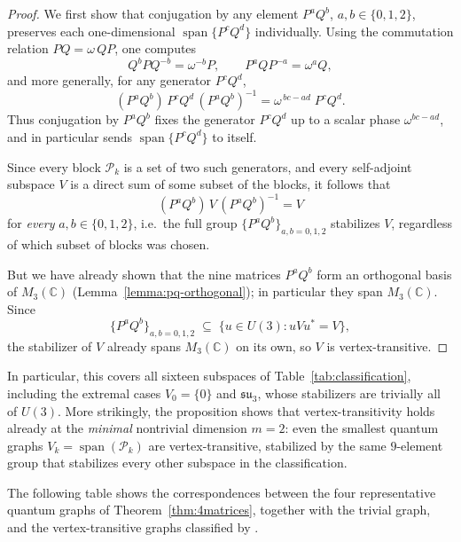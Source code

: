 \begin{proof}
    We first show that conjugation by any element \( P^aQ^b \),
    \( a,b \in \{0,1,2\} \), preserves each one-dimensional
    \( \operatorname{span}\{P^cQ^d\} \) individually. Using the
    commutation relation \( PQ = \omega\,QP \), one computes
    \[
        Q^bPQ^{-b} = \omega^{-b}P, \qquad P^aQP^{-a} = \omega^{a}Q,
    \]
    and more generally, for any generator \( P^cQ^d \),
    \[
        (P^aQ^b)\,P^cQ^d\,(P^aQ^b)^{-1}
        = \omega^{\,bc-ad}\; P^cQ^d.
    \]
    Thus conjugation by \( P^aQ^b \) fixes the generator \( P^cQ^d \)
    up to a scalar phase \( \omega^{bc-ad} \), and in particular sends
    \( \operatorname{span}\{P^cQ^d\} \) to itself.

    Since every block \( \mathcal{P}_k \) is a set of two such
    generators, and every self-adjoint subspace \( V \) is a direct
    sum of some subset of the blocks, it follows that
    \[
        (P^aQ^b)\, V\, (P^aQ^b)^{-1} = V
    \]
    for \emph{every} \( a,b \in \{0,1,2\} \), i.e.\ the full
    group \( \{P^aQ^b\}_{a,b=0,1,2} \) stabilizes
    \( V \), regardless of which subset of blocks was chosen.

    But we have already shown that the nine matrices \( P^aQ^b \) form
    an orthogonal basis of \( M_{3}(\mathbb{C}) \)
    (Lemma~\ref{lemma:pq-orthogonal});
    in particular they
    span \( M_{3}(\mathbb{C}) \). Since
    \[
        \{P^aQ^b\}_{a,b=0,1,2} \;\subseteq\; \{ u \in U(3) : uVu^* = V \},
    \]
    the stabilizer of \( V \) already spans \( M_{3}(\mathbb{C}) \) on
    its own, so \( V \) is vertex-transitive.
\end{proof}

\begin{remark}
    \label{rem:vertex-transitive-all-sixteen}
    In particular, this covers all sixteen subspaces of
    Table~\ref{tab:classification}, including the extremal
    cases \( V_0 = \{0\} \) and \( \mathfrak{su}_3 \), whose
    stabilizers are trivially all of \( U(3) \). More strikingly, the
    proposition shows that vertex-transitivity holds already at the
    \emph{minimal} nontrivial dimension \( m = 2 \): even the smallest
    quantum graphs \( V_k = \operatorname{span}(\mathcal{P}_k) \) are
    vertex-transitive, stabilized by the same \( 9 \)-element group
    that stabilizes every other subspace in the
    classification.
\end{remark}

The following table shows the correspondences between the four
representative quantum graphs of Theorem~\ref{thm:4matrices},
together with the trivial graph, and the vertex-transitive graphs
classified by \textcite[Figure 1]{hayes26}.

